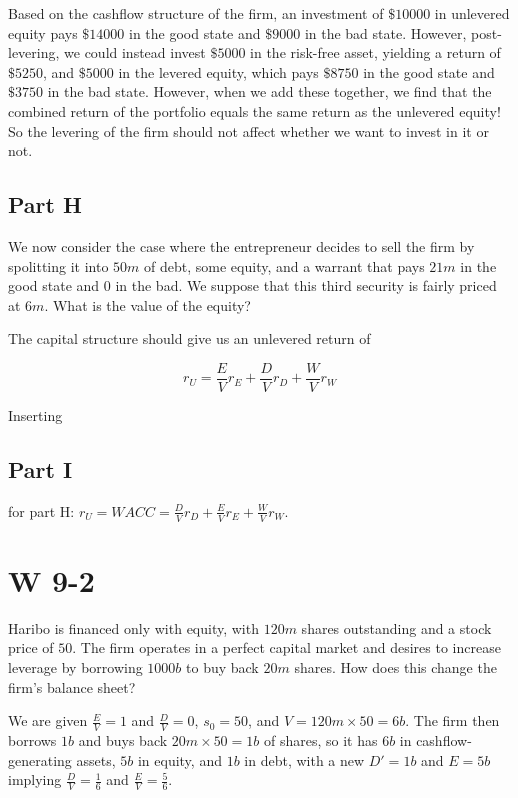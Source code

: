 \documentclass[12pt, letterpaper, parskip = full]{article}
\begin{document}
    Based on the cashflow structure of the firm, an investment of \(\$10000\) in unlevered equity pays \(\$14000\) in the good state and \(\$9000\) in the bad state. However, post-levering, we could instead invest \(\$5000\) in the risk-free asset, yielding a return of \(\$5250\), and \(\$5000\) in the levered equity, which pays \(\$8750\) in the good state and \(\$3750\) in the bad state. However, when we add these together, we find that the combined return of the portfolio equals the same return as the unlevered equity! So the levering of the firm should not affect whether we want to invest in it or not.

    \subsection{Part H}

    We now consider the case where the entrepreneur decides to sell the firm by spolitting it into \(50m\) of debt, some equity, and a warrant that pays \(21m\) in the good state and \(0\) in the bad. We suppose that this third security is fairly priced at \(6m\). What is the value of the equity?

    The capital structure should give us an unlevered return of 

    \[ r_U = \frac{E}{V} r_E + \frac{D}{V} r_D + \frac{W}{V} r_W   \]

    Inserting 

    \subsection{Part I}

    for part H: \(r_U = WACC = \frac{D}{V} r_D + \frac{E}{V} r_E + \frac{W}{V} r_W\). 

    \section{W 9-2}

    Haribo is financed only with equity, with \(120m\) shares outstanding and a stock price of \(50\). The firm operates in a perfect capital market and desires to increase leverage by borrowing \(1000b\) to buy back \(20m\) shares. How does this change the firm's balance sheet?

    We are given \(\frac{E}{V} = 1\) and \(\frac{D}{V} = 0\), \(s_0 = 50\), and \(V = 120m \times 50 = 6b\). The firm then borrows \(1b\) and buys back \(20m \times 50 = 1b\) of shares, so it has \(6b\) in cashflow-generating assets, \(5b\) in equity, and \(1b\) in debt, with a new \(D' = 1b\) and \(E = 5b\) implying \(\frac{D}{V} = \frac{1}{6}\) and \(\frac{E}{V} = \frac{5}{6}\). 
\end{document}
